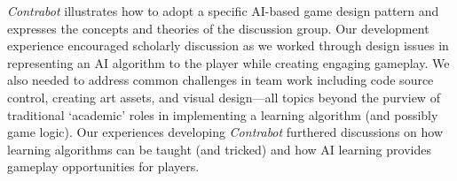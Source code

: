 \documentclass{acm_proc_article-sp}
\begin{document}


\textit{Contrabot} illustrates how to adopt a specific AI-based game design pattern and expresses the concepts and theories of the discussion group.
Our development experience encouraged scholarly discussion as we worked through design issues in representing an AI algorithm to the player while creating engaging gameplay.
We also needed to address common challenges in team work including code source control, creating art assets, and visual design---all topics beyond the purview of traditional `academic' roles in implementing a learning algorithm (and possibly game logic).
Our experiences developing \textit{Contrabot} furthered discussions on how learning algorithms can be taught (and tricked) and how AI learning provides gameplay opportunities for players.

\newpage

%
\end{document}
